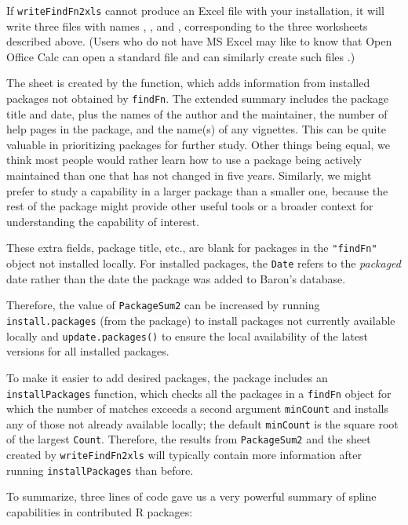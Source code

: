 If {\tt writeFindFn2xls} cannot produce an Excel file with
your installation, it will write three  files with
names , , and
, corresponding to the three
worksheets described above. (Users who do not have MS Excel
may like to know that Open Office Calc can open a standard
 file and can similarly create such files
\citep{CALC09MAN}.)

The  sheet is created by the
 function, which adds information from
installed packages not obtained by
{\tt findFn}.  The extended summary includes the package title and date, plus
the names of the author and the maintainer, the number of help pages
in the package,
and the name(s) of any vignettes.  This can be quite
valuable in prioritizing packages for further study.
Other things being equal, we think most people would
rather learn how to use a package being actively maintained
than one that has not changed in five years.  Similarly,
we might prefer to study a capability in a larger package
than a smaller one, because the rest of the package might
provide other useful tools or a broader context for
understanding the capability of interest.

These extra fields, package title, etc., are blank for
packages in the {\tt "findFn"} object not installed locally.
For installed packages, the {\tt Date} refers to the \emph{packaged} date rather
than the date the package was added to Baron's database.

Therefore, the value of {\tt PackageSum2} can be
increased by running {\tt install.packages} (from the
 package) to install packages not currently
available locally and {\tt update.packages()} to ensure the
local availability of the latest versions for all
installed packages.

To make it easier to add desired packages,
the  package includes
an {\tt installPackages} function, which checks all the
packages in a {\tt findFn} object for which
the number of matches exceeds a second argument {\tt minCount}
and installs any of those not already available locally;  the
default {\tt minCount} is the square root of the largest
{\tt Count}.  Therefore, the results from {\tt PackageSum2} and the
 sheet created by {\tt writeFindFn2xls} will typically
contain more information after running {\tt installPackages}
than before.

To summarize, three lines of code gave us a very powerful
summary of spline capabilities in contributed R
packages:

